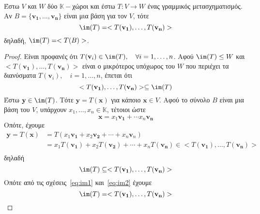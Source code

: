 \begin{thm}\label{thm:imt}
  Έστω $V$ και $W$ δύο $ \mathbb{K}- $χώροι και έστω $ T \colon V \to W $ ένας 
  γραμμικός μετασχηματισμός. Αν $ B = \{ \mathbf{v_{1}}, \ldots, \mathbf{v_{n}} \} $ 
  είναι μια βάση για τον $V$, τότε
  \[
    \im(T) = < T(\mathbf{v_{1}}), \ldots, T(\mathbf{v_{n}}) >  
  \]
  δηλαδή, $ \im(T) = < T(B) > $.
\end{thm}

\begin{proof}
  Είναι προφανές ότι $ T(\mathbf{v}_{i}) \in \im(T), \quad \forall i = 1,\ldots, n $. 
  Αφού $ \im(T) \leq W $ και $ < T(\mathbf{v_{1}}), \ldots, T(\mathbf{v_{n}}) > $ είναι 
  ο μικρότερος υπόχωρος του $W$ που περιέχει τα διανύσματα $ T(\mathbf{v}_{i}), \quad i =
  1,\ldots, n$, έπεται ότι 
  \begin{equation}\label{eq:im1}
    < T(\mathbf{v_{1}}), \ldots, T(\mathbf{v_{n}}) > \subseteq \im(T)  
  \end{equation} 
  Έστω $ \mathbf{y} \in \im(T) $. Τότε $ \mathbf{y}= T(\mathbf{x}) $ για κάποιο $
  \mathbf{x} \in V $. Αφού το σύνολο $B$ είναι μια βάση του $V$, υπάρχουν $ x_{1}, 
  \ldots, x_{n} \in \mathbb{K} $, τέτοιοι ώστε
  \[
    \mathbf{x} = x_{1} \mathbf{v_{1}} + \cdots x_{n} \mathbf{v_{n}}
  \] 
  Οπότε, έχουμε
  \begin{align*}
    \mathbf{y} = T(\mathbf{x})  
    &= T(x_{1} \mathbf{v_{1}}+ x_{2} \mathbf{v_{2}}+ 
    \cdots + x_{n} \mathbf{v}_{n}) \\ 
    &= x_{1}T(\mathbf{v_{1}}) + x_{2}T(\mathbf{v_{2}}) + \cdots + x_{n} 
    T(\mathbf{v_{n}}) \in  < T(\mathbf{v_{1}}), \ldots, T(\mathbf{v_{n}}) >\\ 
  \end{align*}
  δηλαδή
  \begin{equation}\label{eq:im2} 
    \im(T) \subseteq < T(\mathbf{v_{1}}), \ldots, T(\mathbf{v_{n}}) > 
  \end{equation} 
  Οπότε από τις σχέσεις~\eqref{eq:im1} και~\eqref{eq:im2} έχουμε
  \[
    \im(T) = < T(\mathbf{v_{1}}), \ldots, T(\mathbf{v_{n}}) >  
  \]
\end{proof}

